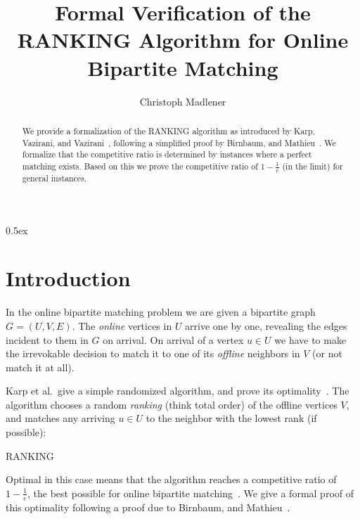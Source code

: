 \documentclass[11pt,a4paper]{article}
\begin{document}
\title{Formal Verification of the RANKING Algorithm for Online Bipartite Matching}
\author{Christoph Madlener}
\maketitle

\begin{abstract}
We provide a formalization of the RANKING algorithm as introduced by Karp, Vazirani, and
Vazirani~\cite{karp1990}, following a simplified proof by Birnbaum, and Mathieu~\cite{birnbaum2008}.
We formalize that the competitive ratio is determined by instances
where a perfect matching exists. Based on this we prove the competitive ratio of $1 - \frac{1}{e}$
(in the limit) for general instances.
\end{abstract}

\tableofcontents

\parindent 0pt\parskip 0.5ex

\section{Introduction}
In the online bipartite matching problem we are given a bipartite graph $G=(U,V,E)$. The \emph{online}
vertices in $U$ arrive one by one, revealing the edges incident to them in $G$ on arrival. On
arrival of a vertex $u \in U$ we have to make the irrevokable decision to match it to one of
its \emph{offline} neighbors in $V$ (or not match it at all).

Karp et al.\ give a simple randomized algorithm, and prove its optimality~\cite{karp1990}. The
algorithm chooses a random \emph{ranking} (think total order) of the offline vertices $V$, and
matches any arriving $u \in U$ to the neighbor with the lowest rank (if possible):

\begin{algorithm}[H]
\DontPrintSemicolon
\caption{RANKING}\label{alg:ranking}
\Online{}
\end{algorithm}

Optimal in this case means that the algorithm reaches a competitive ratio of $1 - \frac{1}{e}$,
the best possible for online bipartite matching~\cite{karp1990}.
We give a formal proof of this optimality following a proof due to Birnbaum, and
Mathieu~\cite{birnbaum2008}.
\end{document}
